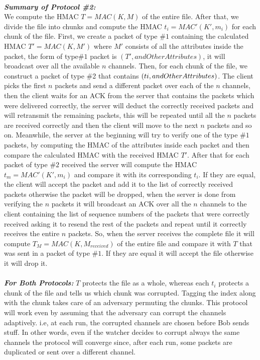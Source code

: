 \documentclass[main.tex]{subfiles}
\begin{document}
\paragraph{}
\textbf{\textit{Summary of Protocol \#2:}}\\
We compute the HMAC $T = MAC(K,M)$ of the entire file. After that, we divide the file into chunks and compute the HMAC $t_i = MAC'(K',m_i)$ for each chunk of the file. First, we create a packet of type \#$1$ containing the calculated HMAC $T' = MAC(K,M')$ where $M'$ consists of all the attributes inside the packet, the form of type\#$1$ packet is $(T', andOtherAttributes)$, it will broadcast over all the available $n$ channels. Then, for each chunk of the file, we construct a packet of type \#2 that contains $(ti, and Other\\ Attributes)$. The client picks the first $n$ packets and send a different packet over each of the $n$ channels, then the client waits for an ACK from the server that contains the packets which were delivered correctly, the server will deduct the correctly received packets and will retransmit the remaining packets, this will be repeated until all the $n$ packets are received correctly and then the client will move to the next $n$ packets and so on. Meanwhile, the server at the beginning will try to verify one of the type $\#1$ packets, by computing the HMAC of the attributes inside each packet and then compare the calculated HMAC with the received HMAC $T'$. After that for each packet of type $\#2$ received the server will compute the HMAC $t_m = MAC'(K',m_i)$ and compare it with its corresponding $t_i$. If they are equal, the client will accept the packet and add it to the list of correctly received packets otherwise the packet will be dropped, when the server is done from verifying the $n$ packets it will broadcast an ACK over all the $n$ channels to the client containing the list of sequence numbers of the packets that were correctly received asking it to resend the rest of the packets and repeat until it correctly receives the entire $n$ packets. So, when the server receives the complete file it will compute $T_M = MAC(K,M_{received})$ of the entire file and compare it with $T$ that was sent in a packet of type \#$1$. If they are equal it will accept the file otherwise it will drop it. 
\paragraph{}
\textbf{\textit{For Both Protocols:}}
$T$ protects the file as a whole, whereas each $t_i$ protects a chunk of the file and tells us which chunk was corrupted. Tagging the index along with the chunk takes care of an adversary permuting the chunks. This protocol will work even by assuming that the adversary can corrupt the channels adaptively. i.e, at each run, the corrupted channels are chosen before Bob sends stuff. In other words, even if the watcher decides to corrupt always the same channels the protocol will converge since, after each run, some packets are duplicated or sent over a different channel. 
\end{document}
